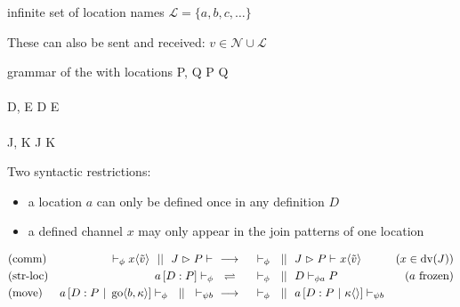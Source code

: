 \cite{fournet_calculus_1996}

infinite set of location names
$ \mathcal{L} = \{ a, b, c, \ldots \} $

These can also be sent and received:
$ v \in \mathcal{N} \cup \mathcal{L} $


\begin{JDef}{grammar of the \joincalc with locations}
  P, Q
  \grmr {}
  \altn {}
  \altn P \jpar Q
  \altn \jnullproc
  \altn {}
  \\ \\
  D, E
  \grmr {}
  \altn D \jcon E
  \altn \jnulldef
  \altn {}
  \\ \\
  J, K
  \grmr {}
  \altn J \jpat K
\end{JDef}

Two syntactic restrictions:
\begin{itemize}
  \item a location $a$ can only be defined once in any definition $D$
  \item a defined channel $x$ may only appear in the join patterns of one location
\end{itemize}

\begin{align*}
  \chamred{comm}{(x \in \dv{J})}{
    \chamcnf{\phi}{}{\jsnd{x}{\tilde{v}}}
    \champar
    \chamcnf{}{\jrct{J}{P}}{}
  }{
    \chamcnf{\phi}{}{}
    \champar
    \chamcnf{}{\jrct{J}{P}}{\jsnd{x}{\tilde{v}}}
  }
  \\
  \chamequ{str-loc}{(a \ \text{frozen)}}{
    \chamcnf{\phi}{\jloc{a}{D}{P}}{}
  }{
    \chamcnf{\phi}{}{}
    \champar
    \chamcnf{\phi a}{D}{P}
  }
  \\
  \chamred{move}{}{
    \chamcnf{\phi}{\jloc{a}{D}{P \jpar \jgo{b}{\kappa}}}{}
    \champar
    \chamcnf{\psi b}{}{}
  }{
    \chamcnf{\phi}{}{}
    \champar
    \chamcnf{\psi b}{\jloc{a}{D}{P \jpar \jsnd{\kappa}{}}}{}
  }
\end{align*}
